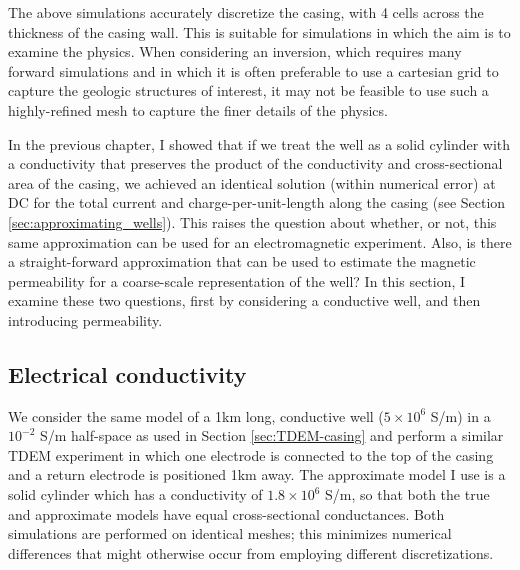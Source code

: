 The above simulations accurately discretize the casing, with 4 cells across the thickness of the casing wall. This is suitable for simulations in which the aim is to examine the physics. When considering an inversion, which requires many forward simulations and in which it is often preferable to use a cartesian grid to capture the geologic structures of interest, it may not be feasible to use such a highly-refined mesh to capture the finer details of the physics.

In the previous chapter, I showed that if we treat the well as a solid cylinder with a conductivity that preserves the product of the conductivity and cross-sectional area of the casing, we achieved an identical solution (within numerical error) at DC for the total current and charge-per-unit-length along the casing (see Section \ref{sec:approximating_wells}). This raises the question about whether, or not, this same approximation can be used for an electromagnetic experiment. Also, is there a straight-forward approximation that can be used to estimate the magnetic permeability for a coarse-scale representation of the well? In this section, I examine these two questions, first by considering a conductive well, and then introducing permeability.
\subsection{Electrical conductivity}
We consider the same model of a 1km long, conductive well ($5 \times 10^6$ S/m) in a $10^{-2}$ S/m half-space as used in Section \ref{sec:TDEM-casing} and perform a similar TDEM experiment in which one electrode is connected to the top of the casing and a return electrode is positioned 1km away. The approximate model I use is a solid cylinder which has a conductivity of $1.8 \times 10^6$ S/m, so that both the true and approximate models have equal cross-sectional conductances. Both simulations are performed on identical meshes; this minimizes numerical differences that might otherwise occur from employing different discretizations.

